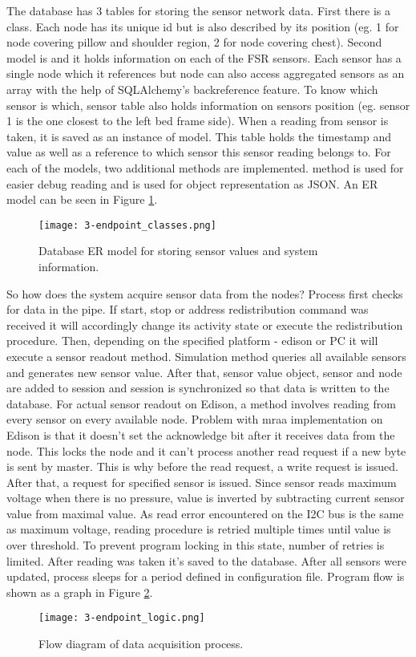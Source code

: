 The database has 3 tables for storing the sensor network data. First there is a  class. Each node has its unique \ac{id} but is also described by its position (eg. 1 for node covering pillow and shoulder region, 2 for node covering chest). Second model is  and it holds information on each of the \ac{FSR} sensors. Each sensor has a single node which it references but node can also access aggregated sensors as an array with the help of SQLAlchemy's backreference feature. To know which sensor is which, sensor table also holds information on sensors position (eg. sensor 1 is the one closest to the left bed frame side). When a reading from sensor is taken, it is saved as an instance of  model. This table holds the timestamp and value as well as a reference to which sensor this sensor reading belongs to. For each of the models, two additional methods are implemented.  method is used for easier debug reading and  is used for object representation as JSON. An \ac{ER} model can be seen in Figure \ref{fig:endpoint_classes}. \\

\begin{figure}[h]
  \begin{center}
    \texttt{[image: 3-endpoint\_classes.png]}
  \end{center}
  \caption{Database \ac{ER} model for storing sensor values and system information.}
  \label{fig:endpoint_classes}
\end{figure}

So how does the system acquire sensor data from the nodes? Process first checks for data in the pipe. If start, stop or address redistribution command was received it will accordingly change its activity state or execute the redistribution procedure. Then, depending on the specified platform - edison or \ac{PC} it will execute a sensor readout method. Simulation method queries all available sensors and generates new sensor value. After that, sensor value object, sensor and node are added to session and session is synchronized so that data is written to the database. For actual sensor readout on Edison, a method involves reading from every sensor on every available node. Problem with mraa implementation on Edison is that it doesn't set the acknowledge bit after it receives data from the node. This locks the node and it can't process another read request if a new byte is sent by master. This is why before the read request, a write request is issued. After that, a request for specified sensor is issued. Since sensor reads maximum voltage when there is no pressure, value is inverted by subtracting current sensor value from maximal value. As read error encountered on the \ac{I2C} bus is the same as maximum voltage, reading procedure is retried multiple times until value is over threshold. To prevent program locking in this state, number of retries is limited. After reading was taken it's saved to the database. After all sensors were updated, process sleeps for a period defined in configuration file. Program flow is shown as a graph in Figure \ref{fig:endpoint_logic}.

\begin{figure}[h]
  \begin{center}
    \texttt{[image: 3-endpoint\_logic.png]}
  \end{center}
  \caption{Flow diagram of data acquisition process.}
  \label{fig:endpoint_logic}
\end{figure}